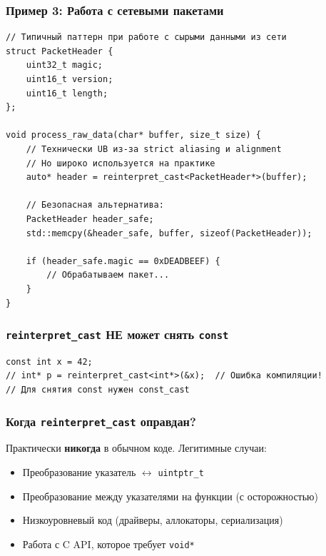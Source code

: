 \documentclass[a4paper,12pt]{article}
\begin{document}
\subsubsection{Пример 3: Работа с сетевыми пакетами}

\begin{lstlisting}
// Типичный паттерн при работе с сырыми данными из сети
struct PacketHeader {
    uint32_t magic;
    uint16_t version;
    uint16_t length;
};

void process_raw_data(char* buffer, size_t size) {
    // Технически UB из-за strict aliasing и alignment
    // Но широко используется на практике
    auto* header = reinterpret_cast<PacketHeader*>(buffer);

    // Безопасная альтернатива:
    PacketHeader header_safe;
    std::memcpy(&header_safe, buffer, sizeof(PacketHeader));

    if (header_safe.magic == 0xDEADBEEF) {
        // Обрабатываем пакет...
    }
}
\end{lstlisting}

\subsubsection{\texttt{reinterpret\_cast} НЕ может снять \texttt{const}}

\begin{lstlisting}
const int x = 42;
// int* p = reinterpret_cast<int*>(&x);  // Ошибка компиляции!
// Для снятия const нужен const_cast
\end{lstlisting}

\subsubsection{Когда \texttt{reinterpret\_cast} оправдан?}

Практически \textbf{никогда} в обычном коде. Легитимные случаи:
\begin{itemize}
    \item Преобразование указатель $\leftrightarrow$ \texttt{uintptr\_t}
    \item Преобразование между указателями на функции (с осторожностью)
    \item Низкоуровневый код (драйверы, аллокаторы, сериализация)
    \item Работа с C API, которое требует \texttt{void*}
\end{itemize}

\end{document}
